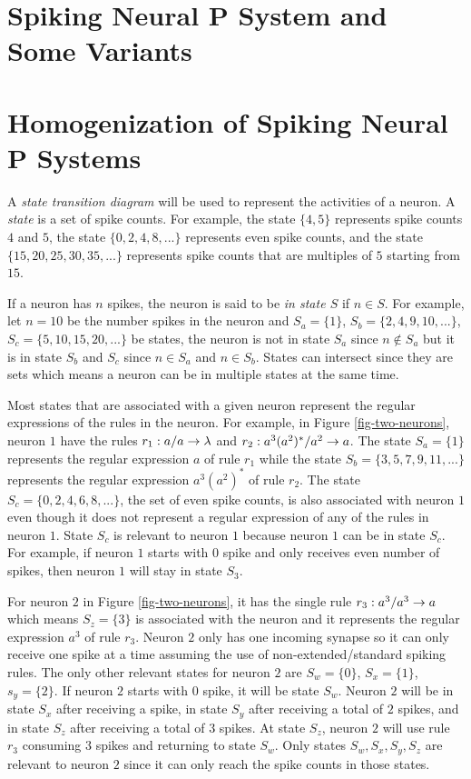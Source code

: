 \documentclass[runningheads,a4paper]{llncs}
\begin{document}
\section{Spiking Neural P System and Some Variants} \label{sec-snps}



\section{Homogenization of Spiking Neural P Systems} \label{sec-homo}

A \emph{state transition diagram} will be used to represent the activities of a neuron. 
A \emph{state} is a set of spike counts. For example, the state $\{4,5\}$ represents spike counts 
$4$ and $5$, the state $\{0,2,4,8,...\}$ represents even spike counts, and the state
$\{15,20,25,30,35,...\}$ represents spike counts that are multiples of $5$ starting from $15$. 

If a neuron has $n$ spikes, the neuron is said to be \emph{in state $S$} if $n \in S$. For example, 
let $n=10$ be the number spikes in the neuron and $S_a=\{1\}$, $S_b=\{2,4,9,10,...\}$, 
$S_c=\{5,10,15,20,...\}$ be states, the neuron is not in state $S_a$ since $n \notin S_a$ but it is
in state $S_b$ and $S_c$ since $n \in S_a$ and $n \in S_b$. States can intersect since they are 
sets which means a neuron can be in multiple states at the same time. 

Most states that are associated with a given neuron represent the regular expressions of the rules
in the neuron. For example, in Figure \ref{fig-two-neurons}, neuron $1$ have the rules
$r_1: a/a \rightarrow \lambda$ and  $r_2: a^3(a^2)^*/a^2 \rightarrow a$. The state $S_a=\{1\}$ represents the
regular expression $a$ of rule $r_1$ while the state $S_b=\{3,5,7,9,11,...\}$ represents the regular 
expression $a^3(a^2)^*$ of rule $r_2$. The state $S_c = \{0,2,4,6,8,...\}$, the set of even spike
counts, is also associated with neuron $1$ even though it does not represent a regular expression of
any of the rules in neuron $1$. State $S_c$ is relevant to neuron $1$ because neuron $1$ can be in
state $S_c$. For example, if neuron $1$ starts with $0$ spike and only receives even number of
spikes, then neuron $1$ will stay in state $S_3$.

For neuron $2$ in Figure \ref{fig-two-neurons}, it has the single rule $r_3: a^3/a^3 \rightarrow a$ which 
means $S_z = \{3\}$ is associated with the neuron and it represents the regular expression $a^3$ of 
rule $r_3$. Neuron $2$ only has one incoming synapse so it can only receive one spike at a time 
assuming the use of non-extended/standard spiking rules. The only other relevant states for neuron 
$2$ are $S_w=\{0\}$, $S_x=\{1\}$, $s_y=\{2\}$. If neuron $2$ starts with $0$ spike, it will be state 
$S_w$. Neuron $2$ will be in state $S_x$ after receiving a spike, in state $S_y$ after receiving a 
total of $2$ spikes, and in state $S_z$ after receiving a total of $3$ spikes. At state $S_z$, 
neuron $2$ will use rule $r_3$ consuming $3$ spikes and  returning to state $S_w$. Only states
$S_w, S_x, S_y, S_z$ are relevant to neuron $2$ since it can only reach the spike counts in those
states.
\end{document}
